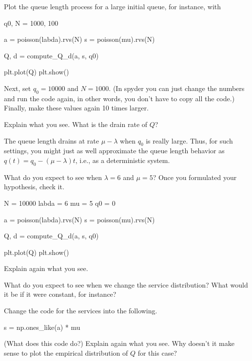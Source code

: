 \documentclass{scrartcl}
\begin{document}
\begin{exercise}
Plot the queue length process for a large initial queue, for instance, with

\begin{pyblock}
q0, N = 1000, 100

a = poisson(labda).rvs(N)
s = poisson(mu).rvs(N)

Q, d = compute_Q_d(a, s, q0)

plt.plot(Q)
plt.show()
  \end{pyblock}

Next, set $q_0=10000$ and $N=1000$.  (In spyder you can just change the numbers and run the code again, in other words, you don't have to copy all the code.) Finally,  make these values again 10 times larger. 

Explain what you see. What is the drain rate of $Q$?
\begin{solution}
  The queue length drains at rate $\mu-\lambda$ when $q_0$ is really large. Thus, for such settings, you might just as well approximate the queue length behavior as $q(t) = q_0 - (\mu-\lambda)t$, i.e., as a deterministic system.
\end{solution}
\end{exercise}

\begin{exercise}
What do you expect to see when $\lambda=6$ and $\mu=5$? Once you formulated your hypothesis, check it.

\begin{pyblock}
N = 10000
labda = 6
mu = 5
q0 = 0

a = poisson(labda).rvs(N)
s = poisson(mu).rvs(N)

Q, d = compute_Q_d(a, s, q0)

plt.plot(Q)
plt.show()
  \end{pyblock}
Explain again what you see.
\end{exercise}

\begin{exercise}
What do you expect to see when we change the service distribution? What would it be if  it were constant,  for instance?

Change the code for the services into the following.
\begin{pyblock}
s = np.ones_like(a) * mu
\end{pyblock}
(What does this code do?) Explain again what you see. Why doesn't it make sense to plot the empirical distribution of $Q$ for this case?
\end{exercise}
\end{document}
